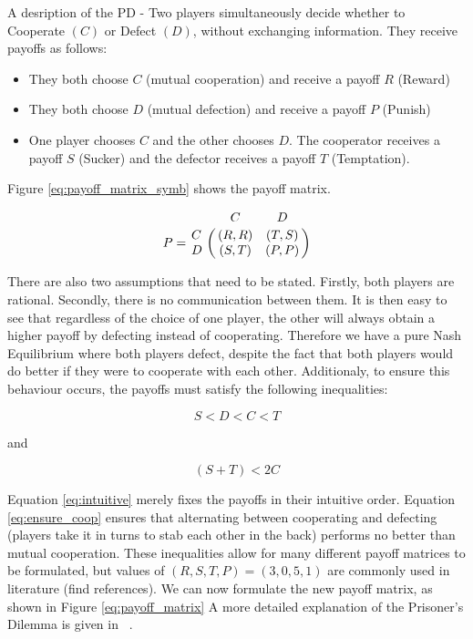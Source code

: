 A desription of the PD - Two players simultaneously decide whether to Cooperate $(C)$ or Defect $(D)$, without exchanging information.
They receive payoffs as follows:

\begin{itemize}
\item They both choose $C$ (mutual cooperation) and receive a payoff $R$ (Reward)
\item They both choose $D$ (mutual defection) and receive a payoff $P$ (Punish)
\item One player chooses $C$ and the other chooses $D$. The cooperator receives a payoff $S$ (Sucker) and the defector receives a payoff $T$ (Temptation).
\end{itemize}

Figure \ref{eq:payoff_matrix_symb} shows the payoff matrix.

\begin{equation}\label{eq:payoff_matrix_symb}
%
P = \bordermatrix{~ & C & D \cr
                  C & (R, R) & (T, S) \cr
                  D & (S, T) & (P, P) \cr}
%
\end{equation}

There are also two assumptions that need to be stated.
Firstly, both players are rational.
Secondly, there is no communication between them.
It is then easy to see that regardless of the choice of one player, the other will always obtain a higher payoff by defecting instead of cooperating.
Therefore we have a pure Nash Equilibrium where both players defect, despite the fact that both players would do better if they were to cooperate with each other.
Additionaly, to ensure this behaviour occurs, the payoffs must satisfy the following inequalities:

\begin{equation}\label{eq:intuitive}
S < D < C < T
\end{equation}

and

\begin{equation}\label{eq:ensure_coop}
(S + T) < 2 C
\end{equation}

Equation \ref{eq:intuitive} merely fixes the payoffs in their intuitive order.
Equation \ref{eq:ensure_coop} ensures that alternating between cooperating and defecting (players take it in turns to stab each other in the back) performs no better than mutual cooperation.
These inequalities allow for many different payoff matrices to be formulated, but values of $(R, S, T, P) = (3, 0, 5, 1)$ are commonly used in literature (find references). %
We can now formulate the new payoff matrix, as shown in Figure \ref{eq:payoff_matrix}
A more detailed explanation of the Prisoner's Dilemma is given in ~\cite{Gotts2003}.

